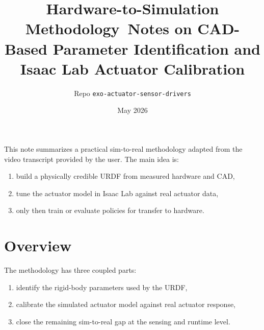 \documentclass[11pt,a4paper]{article}
\title{\textbf{Hardware-to-Simulation Methodology}\
\large Notes on CAD-Based Parameter Identification and Isaac Lab Actuator Calibration}
\author{Repo \texttt{exo-actuator-sensor-drivers}}
\date{May 2026}
\begin{document}
\maketitle

\begin{resultbox}
This note summarizes a practical sim-to-real methodology adapted from the
video transcript provided by the user.  The main idea is:
\begin{enumerate}[leftmargin=1.5em]
  \item build a physically credible URDF from measured hardware and CAD,
  \item tune the actuator model in Isaac Lab against real actuator data,
  \item only then train or evaluate policies for transfer to hardware.
\end{enumerate}
\end{resultbox}

\tableofcontents
\newpage

\section{Overview}

The methodology has three coupled parts:
\begin{enumerate}[leftmargin=2em]
  \item identify the rigid-body parameters used by the URDF,
  \item calibrate the simulated actuator model against real actuator response,
  \item close the remaining sim-to-real gap at the sensing and runtime level.
\end{enumerate}
\end{document}

